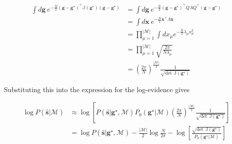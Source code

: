\begin{align*}
    \int d\mathbf{g} \: e^{-\frac{N}{2}  (\mathbf{g} - \mathbf{g}^\star)^\intercal \mathbb{J} (\mathbf{g}^\star) (\mathbf{g} - \mathbf{g}^\star)} &= \int d\mathbf{g} \: e^{-\frac{N}{2}  (\mathbf{g} - \mathbf{g}^\star)^\intercal Q \Lambda Q^\intercal (\mathbf{g} - \mathbf{g}^\star)}\\
    &= \int d\mathbf{x} \: e^{-\frac{N}{2}  \mathbf{x}^\intercal \Lambda \mathbf{x}} \\
    &= \prod_{\mu = 1}^{|\mathcal{M}|} \int dx_\mu e^{-\frac{N}{2} \lambda_\mu x_\mu^2} \\
    &= \prod_{\mu = 1}^{|\mathcal{M}|} \sqrt{\frac{2 \pi}{N \lambda_\mu}} \\
    &= \left(\frac{2 \pi}{N}\right)^\frac{|\mathcal{M}|}{2} \frac{1}{\sqrt{\text{det } \mathbb{J}(\mathbf{g}^\star)}}
\end{align*}

\noindent
Substituting this into the expression for the log-evidence gives

\begin{align*}
    \log P(\mathbf{\hat{s}}|\mathcal{M}) &\approx \log \left[ P(\mathbf{\hat{s}} | \mathbf{g}^\star, \mathcal{M}) P_0(\mathbf{g}^\star|\mathcal{M}) \left(\frac{2 \pi}{N}\right)^\frac{|\mathcal{M}|}{2}  \frac{1}{\sqrt{\text{det } \mathbb{J}(\mathbf{g}^\star)}} \right]\\
    &= \log P(\mathbf{\hat{s}} | \mathbf{g}^\star, \mathcal{M}) -  \frac{|\mathcal{M}|}{2} \log \frac{N}{2 \pi} - \log \left[ \frac{\sqrt{\text{det } \mathbb{J}(\mathbf{g}^\star)}}{P_0(\mathbf{g}^\star|\mathcal{M})} \right]
\end{align*}